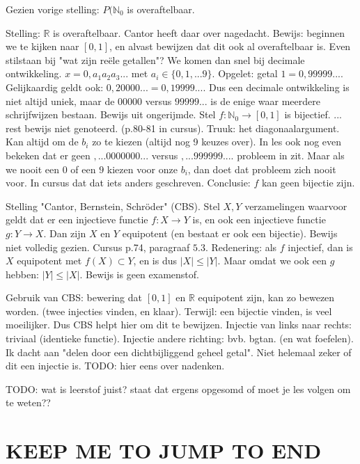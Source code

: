 \documentclass{article}
\begin{document}
Gezien vorige stelling: $P(\mathbb{N}_0$ is overaftelbaar. 

Stelling: $\mathbb{R}$ is overaftelbaar. Cantor heeft daar over nagedacht. Bewijs: beginnen we te kijken naar $[ 0, 1]$, en alvast bewijzen dat dit ook al overaftelbaar is. Even stilstaan bij "wat zijn re\"ele getallen"? We komen dan snel bij decimale ontwikkeling. $x = 0,a_1 a_2 a_3 ...$ met $a_i \in \{ 0,1,...9\}$. Opgelet: getal $1 = 0,99999...$. Gelijkaardig geldt ook: $0,20000... = 0,19999...$. Dus een decimale ontwikkeling is niet altijd uniek, maar de $00000$ versus $99999...$ is de enige waar meerdere schrijfwijzen bestaan. 
Bewijs uit ongerijmde. Stel $f: \mathbb{N}_0 \rightarrow [ 0,1] $ is bijectief. ... rest bewijs niet genoteerd. (p.80-81 in cursus). Truuk: het diagonaalargument. Kan altijd om de $b_i$ zo te kiezen (altijd nog 9 keuzes over). 
In les ook nog even bekeken dat er geen $,...0000000...$ versus $,...999999....$ probleem in zit. Maar als we nooit een $0$ of een $9$ kiezen voor onze $b_i$, dan doet dat probleem zich nooit voor. In cursus dat dat iets anders geschreven. 
Conclusie: $f$ kan geen bijectie zijn. 


Stelling "Cantor, Bernstein, Schr\"oder" (CBS). Stel $X,Y$ verzamelingen waarvoor geldt dat er een injectieve functie $f: X \rightarrow Y$ is, en ook een injectieve functie $g: Y \rightarrow X$. Dan zijn $X$ en $Y$ equipotent (en bestaat er ook een bijectie). Bewijs niet volledig gezien. Cursus p.74, paragraaf $5.3$. 
Redenering: als $f$ injectief, dan is $X$ equipotent met $f(X) \subset Y$, en is dus $|X| \leq |Y|$. Maar omdat we ook een $g$ hebben: $|Y| \leq |X|$. 
Bewijs is geen examenstof. 

Gebruik van CBS: bewering dat $[ 0,1 ]$ en $\mathbb{R}$ equipotent zijn, kan zo bewezen worden. (twee injecties vinden, en klaar). Terwijl: een bijectie vinden, is veel moeilijker. Dus CBS helpt hier om dit te bewijzen. Injectie van links naar rechts: triviaal (identieke functie). Injectie andere richting: bvb. bgtan. (en wat foefelen). Ik dacht aan "delen door een dichtbijliggend geheel getal". Niet helemaal zeker of dit een injectie is. TODO: hier eens over nadenken.  

TODO: wat is leerstof juist? staat dat ergens opgesomd of moet je les volgen om te weten?? 

\section{KEEP ME TO JUMP TO END}
\end{document}

